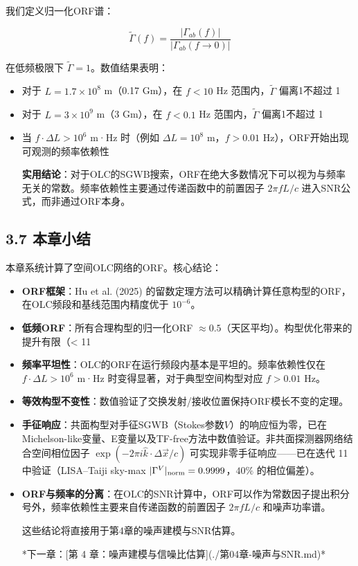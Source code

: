 \documentclass[12pt,a4paper]{article}
\begin{document}
我们定义归一化ORF谱：

$$\tilde{\Gamma}(f) = \frac{|\Gamma_{ab}(f)|}{|\Gamma_{ab}(f \to 0)|}$$

在低频极限下 $\tilde{\Gamma} = 1$。数值结果表明：

\begin{itemize}
  \item 对于 $L = 1.7 \times 10^8$ m（0.17 Gm），在 $f < 10$ Hz 范围内，$\tilde{\Gamma}$ 偏离1不超过 1%
  \item 对于 $L = 3 \times 10^9$ m（3 Gm），在 $f < 0.1$ Hz 范围内，$\tilde{\Gamma}$ 偏离1不超过 1%
  \item 当 $f \cdot \Delta L > 10^6$ m·Hz 时（例如 $\Delta L = 10^8$ m，$f > 0.01$ Hz），ORF开始出现可观测的频率依赖性

\textbf{实用结论}：对于OLC的SGWB搜索，ORF在绝大多数情况下可以视为与频率无关的常数。频率依赖性主要通过传递函数中的前置因子 $2\pi f L/c$ 进入SNR公式，而非通过ORF本身。

\end{itemize}
\subsection{3.7 本章小结}


本章系统计算了空间OLC网络的ORF。核心结论：

\begin{itemize}
  \item[1] \textbf{ORF框架}：Hu et al. (2025) 的留数定理方法可以精确计算任意构型的ORF，在OLC频段和基线范围内精度优于 $10^{-6}$。

  \item[2] \textbf{低频ORF}：所有合理构型的归一化ORF $\approx 0.5$（天区平均）。构型优化带来的提升有限（< 11%

  \item[3] \textbf{频率平坦性}：OLC的ORF在运行频段内基本是平坦的。频率依赖性仅在 $f \cdot \Delta L > 10^6$ m·Hz 时变得显著，对于典型空间构型对应 $f > 0.01$ Hz。

  \item[4] \textbf{等效构型不变性}：数值验证了交换发射/接收位置保持ORF模长不变的定理。

  \item[5] \textbf{手征响应}：共面构型对手征SGWB（Stokes参数$V$）的响应恒为零，已在Michelson-like变量、E变量以及TF-free方法中数值验证。非共面探测器网络结合空间相位因子 $\exp(-2\pi i \hat{k} \cdot \Delta\vec{x}/c)$ 可实现非零手征响应——已在迭代 11 中验证（LISA--Taiji sky-max $|\Gamma^V|_{\rm norm} = 0.9999$，$40\%$ 的相位偏差）。

  \item[6] \textbf{ORF与频率的分离}：在OLC的SNR计算中，ORF可以作为常数因子提出积分号外，频率依赖性主要来自传递函数的前置因子 $2\pi f L/c$ 和噪声功率谱。

这些结论将直接用于第4章的噪声建模与SNR估算。


*下一章：[第 4 章：噪声建模与信噪比估算](./第04章-噪声与SNR.md)*

\end{itemize}
\end{document}
